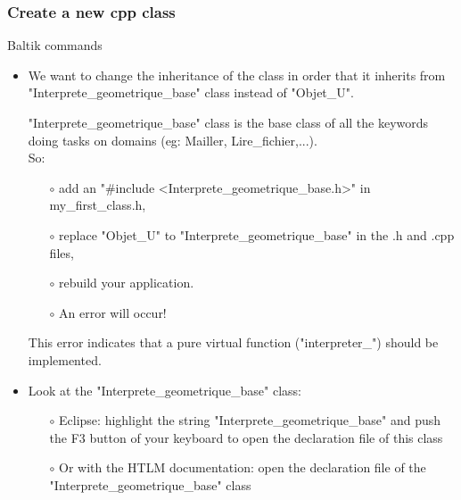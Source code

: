 \documentclass[10pt, hyperref={unicode=true,pdfusetitle, bookmarks=true,bookmarksnumbered=false,bookmarksopen=false, breaklinks=false,pdfborder={0 0 1},backref=true,colorlinks=true,linkcolor=darkblue,pageanchor, urlcolor=darkblue}]{beamer}
\begin{document}
\begin{frame}
\frametitle{Create a new cpp class}
\begin{block}{Baltik commands}

\begin{itemize}
\item We want to change the inheritance of the class in order that it inherits from "Interprete\_geometrique\_base" class
instead of "Objet\_U".

"Interprete\_geometrique\_base" class is the base class of all the keywords doing tasks on domains (eg: Mailler, Lire\_fichier,...).\\
\vspace{0.1cm}
So:
    \begin{itemize}
    \item [$\circ$] add an "\#include <Interprete\_geometrique\_base.h>" in my\_first\_class.h,
    \item [$\circ$] replace "Objet\_U" to "Interprete\_geometrique\_base" in the .h and .cpp files,
    \item [$\circ$] rebuild your application.\\
    \item [$\circ$] An error will occur!
    \end{itemize}

This error indicates that a pure virtual function ("interpreter\_") should be implemented.

\item Look at the "Interprete\_geometrique\_base" class:
    \begin{itemize}
    \item [$\circ$] Eclipse: highlight the string "Interprete\_geometrique\_base" and push the F3 button of your keyboard to open the declaration file of this class
    \item [$\circ$] Or with the HTLM documentation: open the declaration file of the "Interprete\_geometrique\_base" class
    \end{itemize}
\end{itemize}

\end{block}
\end{frame}
\end{document}
